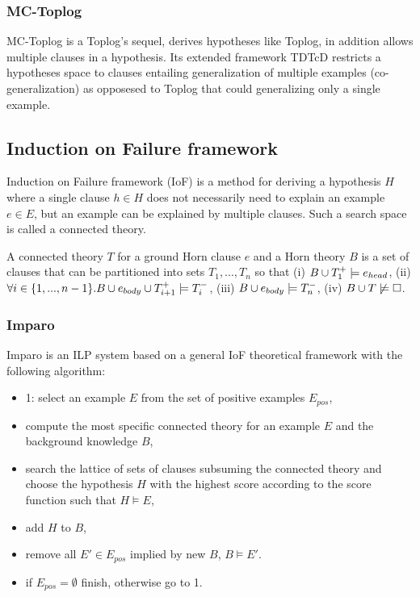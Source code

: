 \subsubsection{MC-Toplog\cite{muggleton2012}}
MC-Toplog is a Toplog's sequel, derives hypotheses like Toplog, in addition allows multiple clauses in a hypothesis. Its extended framework TDTcD restricts a hypotheses space to clauses entailing generalization of multiple examples (co-generalization) as opposesed to Toplog that could generalizing only a single example.

\subsection{Induction on Failure framework\cite{kimber2011}}
Induction on Failure framework (IoF) is a method for deriving a hypothesis $H$ where a single clause $h \in H$ does not necessarily need to explain an example $e \in E$, but an example can be explained by multiple clauses. Such a search space is called a connected theory.
\begin{defn}
A connected theory $T$ for a ground Horn clause $e$ and a Horn theory $B$ is a set of clauses that can be partitioned into sets $T_1, ..., T_n$ so that
(i) $B \cup T_1^+ \models e_{head}$,
(ii) $\forall i \in \{1, ..., n-1\}. B \cup e_{body} \cup T_{i+1}^+ \models T_i^-$,
(iii) $B \cup e_{body} \models T_n^-$,
(iv) $B \cup T \not\models \square$.
\end{defn}

\subsubsection{Imparo\cite{kimber2011}}
Imparo is an ILP system based on a general IoF theoretical framework with the following algorithm:
\begin{itemize}
\item 1: select an example $E$ from the set of positive examples $E_{pos}$,
\item compute the most specific connected theory for an example $E$ and the background knowledge $B$,
\item search the lattice of sets of clauses subsuming the connected theory and choose the hypothesis $H$ with the highest score according to the score function such that $H \models E$,
\item add $H$ to $B$,
\item remove all $E' \in E_{pos}$ implied by new $B$, $B \models E'$.
\item if $E_{pos} = \emptyset$ finish, otherwise go to 1.
\end{itemize}

